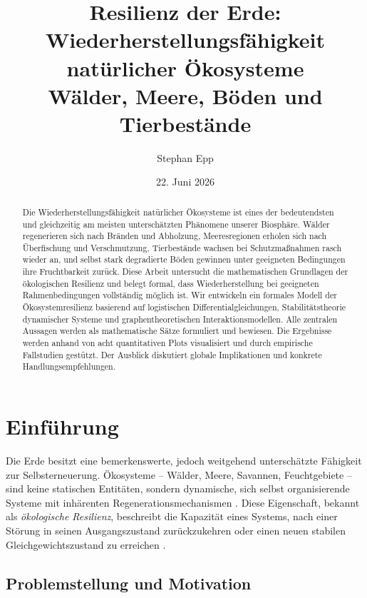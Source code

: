 ﻿\documentclass[a4paper,12pt]{article}
\title{Resilienz der Erde:\\
Wiederherstellungsfähigkeit natürlicher Ökosysteme\\\large
Wälder, Meere, Böden und Tierbestände}
\author{Stephan Epp}
\date{22. Juni 2026}
\theoremstyle{definition}
\begin{document}
	
\maketitle

\begin{abstract}
Die Wiederherstellungsfähigkeit natürlicher Ökosysteme ist eines der bedeutendsten und gleichzeitig am meisten unterschätzten Phänomene unserer Biosphäre. Wälder regenerieren sich nach Bränden und Abholzung, Meeresregionen erholen sich nach Überfischung und Verschmutzung, Tierbestände wachsen bei Schutzmaßnahmen rasch wieder an, und selbst stark degradierte Böden gewinnen unter geeigneten Bedingungen ihre Fruchtbarkeit zurück. Diese Arbeit untersucht die mathematischen Grundlagen der ökologischen Resilienz und belegt formal, dass Wiederherstellung bei geeigneten Rahmenbedingungen vollständig möglich ist. Wir entwickeln ein formales Modell der Ökosystemresilienz basierend auf logistischen Differentialgleichungen, Stabilitätstheorie dynamischer Systeme und graphentheoretischen Interaktionsmodellen. Alle zentralen Aussagen werden als mathematische Sätze formuliert und bewiesen. Die Ergebnisse werden anhand von acht quantitativen Plots visualisiert und durch empirische Fallstudien gestützt. Der Ausblick diskutiert globale Implikationen und konkrete Handlungsempfehlungen.
\end{abstract}

\tableofcontents
\newpage

\section{Einführung}

Die Erde besitzt eine bemerkenswerte, jedoch weitgehend unterschätzte Fähigkeit zur Selbsterneuerung. Ökosysteme -- Wälder, Meere, Savannen, Feuchtgebiete -- sind keine statischen Entitäten, sondern dynamische, sich selbst organisierende Systeme mit inhärenten Regenerationsmechanismen \cite{holling1973resilience}. Diese Eigenschaft, bekannt als \emph{ökologische Resilienz}, beschreibt die Kapazität eines Systems, nach einer Störung in seinen Ausgangszustand zurückzukehren oder einen neuen stabilen Gleichgewichtszustand zu erreichen \cite{walker2004resilience}.

\subsection{Problemstellung und Motivation}
\end{document}
